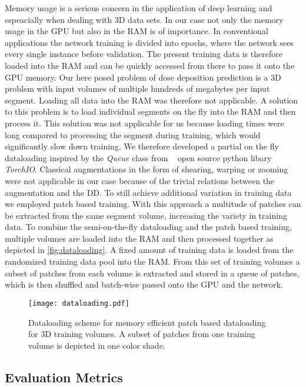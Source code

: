 Memory usage is a serious concern in the application of deep learning and espeacially when dealing with 3D data sets. 
In our case not only the memory usage in the \ac{GPU} but also in the \ac{RAM} is of importance. 
In conventional applications the network training is divided into epochs, where the network sees every single instance before validation.
The present training data is therefore loaded into the \acs{RAM} and can be quickly accessed from there to pass it onto the \acs{GPU} memory.
Our here posed problem of dose deposition prediction is a 3D problem with input volumes of multiple hundreds of megabytes per input segment.
Loading all data into the \acs{RAM} was therefore not applicable. 
A solution to this problem is to load individual segments on the fly into the RAM and then process it.
This solution was not applicable for us because loading times were long compared to processing the segment during training, which would significantly slow down training.
We therefore developed a partial on the fly dataloading inspired by the \emph{Queue} class from \citeauthor{perez-garcia_torchio_2021}~\cite{perez-garcia_torchio_2021} open source python libary \emph{TorchIO}.
Classical augmentations in the form of shearing, warping or zooming were not applicable in our case because of the trivial relations between the augmentation and the \acs{DD}.
To still achieve additional variation in training data we employed patch based training. 
With this approach a multitude of patches can be extracted from the same segment volume, increasing the variety in training data.
To combine the semi-on-the-fly dataloading and the patch based training, multiple volumes are loaded into the RAM and then processed together as depicted in \autoref{fig:dataloading}. 
A fixed amount of training data is loaded from the randomized training data pool into the \acs{RAM}. 
From this set of training volumes a subset of patches from each volume is extracted and stored in a queue of patches, which is then shuffled and batch-wise passed onto the \acs{GPU} and the network. 

\begin{figure}
    \centering
    \texttt{[image: dataloading.pdf]}
    \caption{Dataloading scheme for memory efficient patch based dataloading for 3D training volumes. A subset of patches from one training volume is depicted in one color shade.}\label{fig:dataloading}
\end{figure}

\subsection{Evaluation Metrics}

